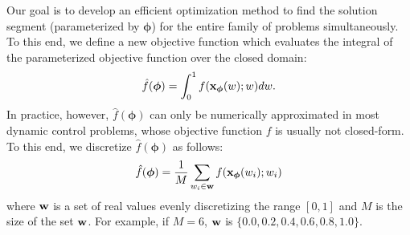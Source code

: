 Our goal is to develop an efficient optimization method to find the
solution segment (parameterized by $\boldsymbol{\phi}$) for the entire family of problems
simultaneously. To this end, we define a new objective function which
evaluates the integral of the parameterized objective function over the closed
domain:
\begin{eqnarray}
  \hat{f}(\boldsymbol{\phi}) = \int_0^1 f(\mathbf{x}_{\boldsymbol{\phi}}(w); w) dw.
\end{eqnarray}
In practice, however, $\hat{f}(\boldsymbol{\phi})$ can only be numerically approximated
in most dynamic control problems, whose objective function $f$ is usually not closed-form. To this end, we discretize $\hat{f}(\boldsymbol{\phi})$ as follows: 
\begin{eqnarray}
  \label{eq:optskills_discretized}
  \hat{f}(\boldsymbol{\phi}) = \frac{1}{M}\sum_{w_i \in \mathbf{w}} f(\mathbf{x}_{\boldsymbol{\phi}}(w_i); w_i)
\end{eqnarray}
where $\mathbf{w}$ is a set of real values evenly discretizing the range
$[0,1]$ and $M$ is the size of the set $\mathbf{w}$.  For example, if $M=6$,
$\mathbf{w}$ is $\{0.0, 0.2, 0.4, 0.6, 0.8, 1.0\}$.

